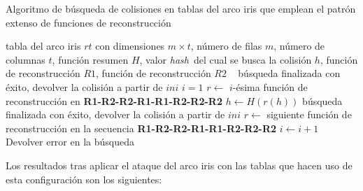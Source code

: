 \documentclass[12pt,spanish,listoffigures,listoftables,listofalgorithms]{tfgetsinf}
\newcommand{\hash}{\textit{hash}}
\begin{document}
\begin{algorithm}[H]
	\caption{Algoritmo de búsqueda de colisiones en tablas del arco iris que emplean el patrón extenso de funciones de reconstrucción}
	\label{buscolsPG}
	\begin{algorithmic}
		\REQUIRE tabla del arco iris $rt$ con dimensiones $m \times t$, número de filas $m$, número de columnas $t$, función resumen $H$, valor \hash~del cual se busca la colisión $h$, función de reconstrucción $R1$, función de reconstrucción $R2$
		\STATE ~
			\STATE búsqueda finalizada con éxito, devolver la colisión a partir de $ini$
		\ENDIF
		\STATE $i = 1$
			\STATE $r \leftarrow $ $i$-ésima función de reconstrucción en \textbf{R1-R2-R2-R1-R1-R2-R2-R2}
				\STATE $h \leftarrow H(r(h))$
					\STATE búsqueda finalizada con éxito, devolver la colisión a partir de $ini$
				\ELSE
					\STATE $r \leftarrow $ siguiente función de reconstrucción en la secuencia \textbf{R1-R2-R2-R1-R1-R2-R2-R2}
				\ENDIF
			\ENDFOR
			\STATE $i \leftarrow i + 1$
		\ENDWHILE
		\STATE Devolver error en la búsqueda
	\end{algorithmic}
\end{algorithm}

Los resultados tras aplicar el ataque del arco iris con las tablas que hacen uso de esta configuración son los siguientes:
\end{document}
